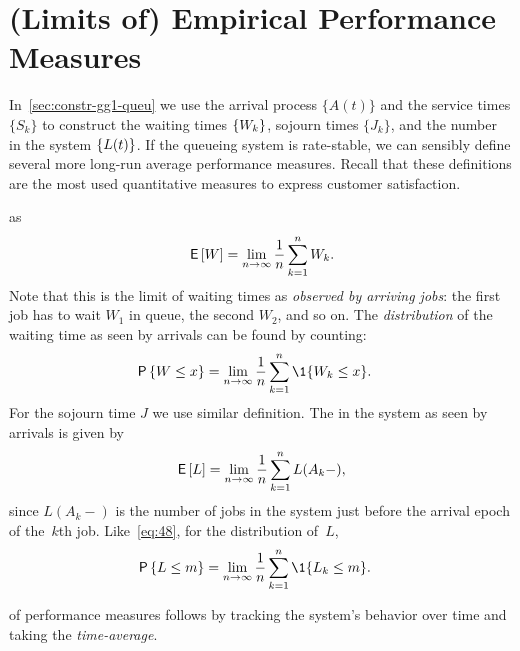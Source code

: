 \documentclass[stochastic-or.tex]{subfiles}
\begin{document}
\section{(Limits of) Empirical Performance Measures}
\label{sec:limits-of-empirical}

In~\cref{sec:constr-gg1-queu} we use the arrival process $\{A(t)\}$ and the service times $\{S_k\}$ to construct the waiting times $\{W_k\}$, sojourn times $\{J_k\}$, and the number in the system $\{L(t)\}$.
If the queueing system is rate-stable, we can sensibly define several more long-run average performance measures.
Recall that these definitions are the most used quantitative measures to express customer satisfaction.




  as
\begin{equation*}
 \,\mathsf{E}\left[W\right] = \lim_{n\to\infty} \frac 1 n\sum_{k=1}^n W_{k}.
\end{equation*}
Note that this is the limit of waiting times as \emph{observed by arriving jobs}:
 the first job has to wait $W_1$ in queue, the second $W_2$, and so on.
The \emph{distribution} of the waiting time as seen by arrivals can be found by counting:
\begin{align}\label{eq:48}
 \P{\W \leq x} &= \lim_{n\to\infty} \frac 1n\sum_{k=1}^n \1{\W_k\leq x}.
\end{align}
For the sojourn time  $J$  we use similar definition.
The  in the system as seen by arrivals is given by
\begin{equation}\label{eq:EQ}
\,\mathsf{E}\left[L\right] = \lim_{n\to\infty}\frac 1 n \sum_{k=1}^n L(A_k-),
\end{equation}
since $L(A_k-)$ is the number of jobs in the system just before the arrival epoch of the~$k$th job.
Like~\cref{eq:48}, for the distribution of~$L$,
\begin{align}
 \P{\L \leq m} &= \lim_{n\to\infty} \frac 1n\sum_{k=1}^n \1{\L_k\leq m}.
\end{align}



 of performance measures follows by tracking the system's behavior over time and taking the \emph{time-average}.
\end{document}
